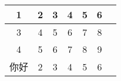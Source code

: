 \documentclass{article}
\begin{document}
\begin{table}
\begin{tabular}{|c|c|c|c|c|c|c|}
\hline
1&2&3&4&5&6\\
\hline
3&4&5&6&7&8\\
\hline
4&5&6&7&8&9\\
\hline
你好&2&3&4&5&6\\
\hline
\end{tabular}
\end{table}
\end{document}
